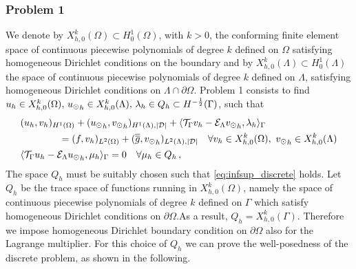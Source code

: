 \subsubsection{Problem 1}
We denote by $X_{h,0}^k(\Omega)\subset H^1_0(\Omega)$, with $k>0$, the conforming finite element space of continuous piecewise polynomials of degree $k$ defined on $\Omega$ satisfying homogeneous Dirichlet conditions on the boundary and by $X_{h,0}^k(\Lambda)\subset H^1_0(\Lambda)$ the space of continuous piecewise polynomials of degree $k$ defined on $\Lambda$, satisfying homogeneous Dirichlet conditions on $\Lambda \cap \partial \Omega$. 
Problem 1 consists to find $u_h \in X_{h,0}^k (\Omega) ,\, {u_{\odot}}_h \in X_{h,0}^k(\Lambda) ,\, \lambda_h \in Q_h \subset H^{-\frac12}(\Gamma )$, such that
\begin{subequations}
\begin{align}
&(u_h,v_h)_{H^1(\Omega)} + ({u_{\odot}}_h,{v_{\odot}}_h)_{H^1(\Lambda),|\mathcal{D}|} 
+ \langle {\mathcal{T}_\Gamma} v_h  - \mathcal{E}_{\Lambda} {v_{\odot}}_h, \lambda_h \rangle_\Gamma 
\\
\nonumber
&\qquad\qquad= (f,v_h)_{L^2(\Omega)} + (\overline{\overline{g}},{v_{\odot}}_h)_{L^2(\Lambda),|\mathcal{D}|}
\quad \forall v_h \in X_{h,0}^k(\Omega), \ {v_{\odot}}_h \in X_{h,0}^k(\Lambda)
\\
&   \langle {\mathcal{T}_\Gamma} u_h - \mathcal{E}_{\Lambda} {u_{\odot}}_h , \mu_h \rangle_\Gamma = 0
\quad \forall \mu_h \in Q_h\,,
\end{align}
\end{subequations}
The space $Q_h$ must be suitably chosen such that \eqref{eq:infsup_discrete} holds. Let $Q_h$ be the trace space of functions running in $X_{h,0}^k(\Omega)$, namely the space of continuous piecewise polynomials of degree $k$ defined on $\Gamma$ which satisfy homogeneous Dirichlet conditions on $\partial \Omega$.As a result, $Q_h=X_{h,0}^k(\Gamma)$. Therefore we impose homogeneous Dirichlet boundary condition on $\partial \Omega$ also for the Lagrange multiplier. For this choice of $Q_h$ we can prove the well-posedness of the discrete problem, as shown in the following. 

